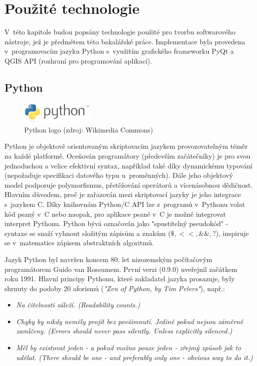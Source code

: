 \chapter{Použité technologie}
\label{3-technologie}

V~této kapitole budou popsány technologie použité pro tvorbu
softwarového nástroje, jež je předmětem této bakalářské
práce. Implementace byla provedena v~programo\-vacím jazyku Python
s~využitím grafického frameworku PyQt a QGIS API (rozhraní pro
programování aplikací).

\section{Python}
\begin{figure}[H] \centering
      \includegraphics[width=100pt]{./pictures/python.png}
      \caption[Python logo]{Python logo (zdroj: Wikimedia Commons)}
      \label{fig:python}
\end{figure}
  
Python je objektově orientovaným skriptovacím jazykem provozovatelným
téměr na každé platformě. Oceňován programátory (především
začátečníky) je pro svou jednoduchou a velice efektivní syntax,
například také díky dynamickému typování (nepožaduje specifikaci
datového typu u~proměnných). Dále jeho objektový model podporuje
polymorfismus, přetěžování operátorů a vícenásobnou dědičnost. Hlavním
důvodem, proč je zařazován mezi skriptovací jazyky je jeho integrace
s~jazykem C. Díky knihovnám Python/C API lze z~programů v~Pythonu
volat kód psaný v~C nebo naopak, pro aplikace psané v~C je možné
integrovat interpret Pythonu.  Python bývá označován jako "spustitelný
pseudokód" - syntaxe se snaží vyhnout složitým zápisům a znakům ($\$,
<<, \&\&, ?$), inspiruje se v~matematice zápisem abstraktních
algoritmů.\cite{learningPython}

Jazyk Python byl navržen koncem 80. let nizozemským počítačovým
programátorem Guido van Rossumem. První verzi (0.9.0) uveřejnil
začátkem roku 1991. Hlavní principy Pythonu, které zakladatel jazyka
prosazuje, byly shrnuty do podoby 20 aforismů (\textit{"Zen of Python,
by Tim Peters"}), např.:

\begin{itemize}

	\item \textit{Na čitelnosti záleží. (Readability counts.)}
			
	\item \textit{Chyby by nikdy neměly projít bez
povšimnutí. Jedině pokud nejsou záměrně zamlčeny. (Errors should never
pass silently. Unless explicitly silenced.)}
		
	\item \textit{Měl by existovat jeden - a pokud možno pouze
jeden - zřejmý způsob jak to udělat. (There should be one - and
preferably only one - obvious way to do it.)}
\end{itemize}

